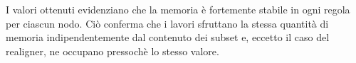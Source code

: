 I valori ottenuti evidenziano che la memoria è fortemente stabile in ogni regola per ciascun nodo.
Ciò conferma che i lavori sfruttano la stessa quantità di memoria indipendentemente dal contenuto dei subset e, eccetto il caso del realigner, ne occupano pressochè lo stesso valore. 


%
%
%
